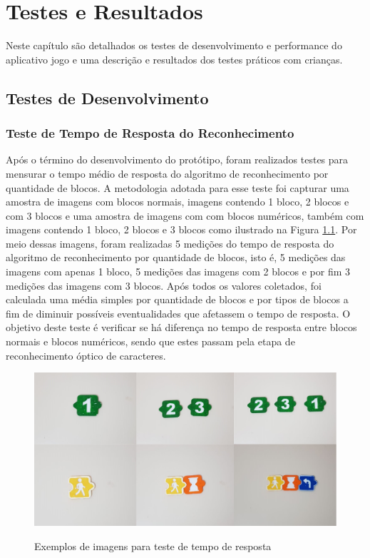 \chapter{Testes e Resultados}\label{cap:testes_e_resultados}
Neste capítulo são detalhados os testes de desenvolvimento e performance do aplicativo jogo e uma descrição e resultados dos testes práticos com crianças.

\section{Testes de Desenvolvimento}


\subsection{\textbf{Teste de Tempo de Resposta do Reconhecimento}}

Após o término do desenvolvimento do protótipo, foram realizados testes para mensurar o tempo médio de resposta do algoritmo de reconhecimento por quantidade de blocos. A metodologia adotada para esse teste foi capturar uma amostra de imagens com blocos normais, imagens contendo 1 bloco, 2 blocos e com 3 blocos e uma amostra de imagens com com blocos numéricos, também com imagens contendo 1 bloco, 2 blocos e 3 blocos como ilustrado na Figura \ref{figura:ttr}. Por meio dessas imagens, foram realizadas 5 medições do tempo de resposta do algoritmo de reconhecimento por quantidade de blocos, isto é, 5 medições das imagens com apenas 1 bloco, 5 medições das imagens com 2 blocos e por fim 3 medições das imagens com 3 blocos. Após todos os valores coletados, foi calculada uma média simples por quantidade de blocos e por tipos de blocos a fim de diminuir possíveis eventualidades que afetassem o tempo de resposta. O objetivo deste teste é verificar se há diferença no tempo de resposta entre blocos normais e blocos numéricos, sendo que estes passam pela etapa de reconhecimento óptico de caracteres.

\begin{figure}[H]
    \caption{Exemplos de imagens para teste de tempo de resposta}
    \centering
    \includegraphics[width=15cm]{Imagens/Cap5/ttr.png}
    \label{figura:ttr}
\end{figure}

